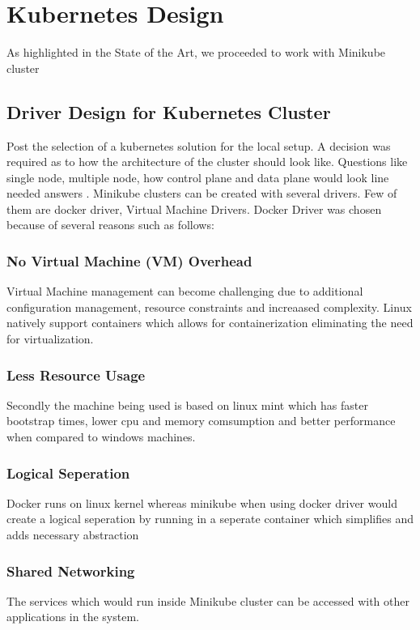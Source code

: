 \section{Kubernetes Design}
As highlighted in the State of the Art, we proceeded to work with Minikube cluster

\subsection{Driver Design for Kubernetes Cluster}
Post the selection of a kubernetes solution for the local setup. A decision was required as to how the architecture of the cluster should look like. Questions like single node, multiple node, how control plane and data plane would look line needed answers . Minikube clusters can be created with several drivers. Few of them are docker driver, Virtual Machine Drivers. Docker Driver was chosen because of several reasons such as follows:

\subsubsection{No Virtual Machine (VM) Overhead}
Virtual Machine management can become challenging due to additional configuration management, resource constraints and increaased complexity. Linux natively support containers which allows for containerization eliminating the need for virtualization. 

\subsubsection{Less Resource Usage}
Secondly the machine being used is based on linux mint which has faster bootstrap times, lower cpu and memory comsumption and better performance when compared to windows machines.

\subsubsection{Logical Seperation}
Docker runs on linux kernel whereas minikube when using docker driver would create a logical seperation by running in a seperate container which simplifies and adds necessary abstraction

\subsubsection{Shared Networking}
The services which would run inside Minikube cluster can be accessed with other applications in the system.

